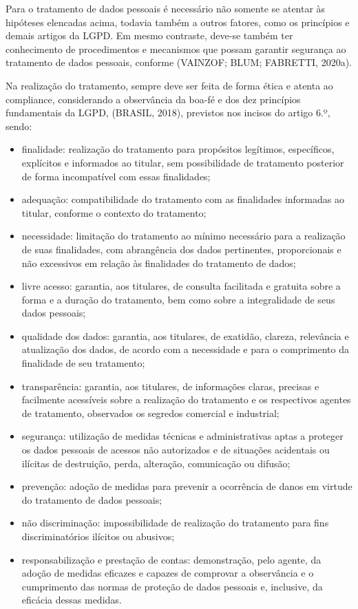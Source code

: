 \documentclass[
	12pt,				%
	openright,			%
	oneside,			%
	a4paper,			%
	english,			%
	french,				%
	spanish,			%
	brazil,				%
	]{abntex2}
\begin{document}
Para o tratamento de dados pessoais é necessário não somente se atentar às hipóteses elencadas acima, todavia também a outros fatores, como os princípios e demais artigos da LGPD. Em mesmo contraste, deve-se também ter conhecimento de procedimentos e mecanismos que possam garantir segurança ao tratamento de dados pessoais, conforme (VAINZOF; BLUM; FABRETTI, 2020a).

Na realização do tratamento, sempre deve ser feita de forma ética e atenta ao compliance, considerando a observância da boa-fé e dos dez princípios fundamentais da LGPD, (BRASIL, 2018), previstos nos incisos do artigo 6.º, sendo:

\begin{itemize}
\item finalidade: realização do tratamento para propósitos legítimos, específicos, explícitos e informados ao titular, sem possibilidade de tratamento posterior de forma incompatível com essas finalidades;
\item adequação: compatibilidade do tratamento com as finalidades informadas ao titular, conforme o contexto do tratamento;
\item necessidade: limitação do tratamento ao mínimo necessário para a realização de suas finalidades, com abrangência dos dados pertinentes, proporcionais e não excessivos em relação às finalidades do tratamento de dados;
\item livre acesso: garantia, aos titulares, de consulta facilitada e gratuita sobre a forma e a duração do tratamento, bem como sobre a integralidade de seus dados pessoais;
\item qualidade dos dados: garantia, aos titulares, de exatidão, clareza, relevância e atualização dos dados, de acordo com a necessidade e para o comprimento da finalidade de seu tratamento;
\item transparência: garantia, aos titulares, de informações claras, precisas e facilmente acessíveis sobre a realização do tratamento e os respectivos agentes de tratamento, observados os segredos comercial e industrial;
\item segurança: utilização de medidas técnicas e administrativas aptas a proteger os dados pessoais de acessos não autorizados e de situações acidentais ou ilícitas de destruição, perda, alteração, comunicação ou difusão;
\item prevenção: adoção de medidas para prevenir a ocorrência de danos em virtude do tratamento de dados pessoais;
\item não discriminação: impossibilidade de realização do tratamento para fins discriminatórios ilícitos ou abusivos; 
\item responsabilização e prestação de contas: demonstração, pelo agente, da adoção de medidas eficazes e capazes de comprovar a observância e o cumprimento das normas de proteção de dados pessoais e, inclusive, da eficácia dessas medidas.
\end{itemize}
\end{document}
